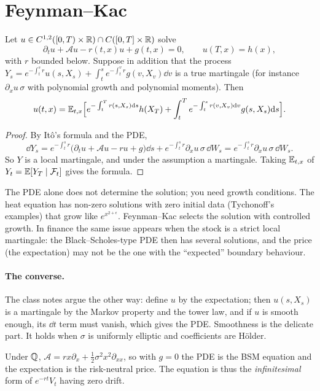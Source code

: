 \section{Feynman--Kac}

\begin{theorem}\label{thm:fk}
Let $u\in C^{1,2}([0,T)\times\mathbb{R})\cap C([0,T]\times\mathbb{R})$ solve
\[
\partial_tu+\mathcal{A}u-r(t,x)u+g(t,x)=0,\qquad u(T,x)=h(x),
\]
with $r$ bounded below. Suppose in addition that the process $Y_s=e^{-\int_t^sr}u(s,X_s)+\int_t^se^{-\int_t^vr}g(v,X_v)\dd v$ is a true martingale (for instance $\partial_xu\,\sigma$ with polynomial growth and polynomial moments). Then
\[
u(t,x)=\mathbb{E}_{t,x}\Bigl[e^{-\int_t^Tr(s,X_s)\mathrm{d} s}h(X_T)+\int_t^Te^{-\int_t^sr(v,X_v)\mathrm{d} v}g(s,X_s)\mathrm{d} s\Bigr].
\]
\end{theorem}
\begin{proof}
By It\^o's formula and the PDE,
\[
\dd Y_s=e^{-\int_t^sr}\bigl(\partial_tu+\mathcal{A}u-ru+g\bigr)\dd s+e^{-\int_t^sr}\partial_xu\,\sigma\,\dd W_s=e^{-\int_t^sr}\partial_xu\,\sigma\,\dd W_s.
\]
So $Y$ is a local martingale, and under the assumption a martingale. Taking $\mathbb{E}_{t,x}$ of $Y_t=\mathbb{E}[Y_T\mid\mathcal{F}_t]$ gives the formula.
\end{proof}

\begin{pitfall}
The PDE alone does not determine the solution; you need growth conditions. The heat equation has non-zero solutions with zero initial data (Tychonoff's examples) that grow like $e^{x^{2+\epsilon}}$. Feynman--Kac selects the solution with controlled growth. In finance the same issue appears when the stock is a strict local martingale: the Black--Scholes-type PDE then has several solutions, and the price (the expectation) may not be the one with the ``expected'' boundary behaviour.
\end{pitfall}

\paragraph{The converse.} The class notes argue the other way: define $u$ by the expectation; then $u(s,X_s)$ is a martingale by the Markov property and the tower law, and if $u$ is smooth enough, its $\dd t$ term must vanish, which gives the PDE. Smoothness is the delicate part. It holds when $\sigma$ is uniformly elliptic and coefficients are H\"older.

\begin{example}
Under $\mathbb{Q}$, $\mathcal{A}=rx\partial_x+\tfrac12\sigma^2x^2\partial_{xx}$, so with $g=0$ the PDE is the BSM equation and the expectation is the risk-neutral price. The equation is thus the \emph{infinitesimal} form of $e^{-rt}V_t$ having zero drift.
\end{example}

